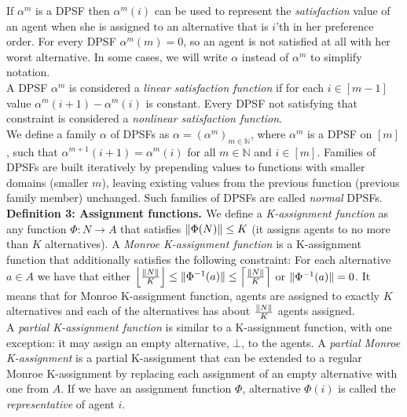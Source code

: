 If $\alpha^{m}$ is a DPSF then $\alpha^{m}(i)$ can be used to represent the \textit{satisfaction} value of an agent when she is assigned to an alternative that is $i$'th in her preference order. For every DPSF $\alpha^{m}(m) = 0$, so an agent is not satisfied at all with her worst alternative. In some cases, we will write $\alpha$ instead of $\alpha^{m}$ to simplify notation.
\\

A DPSF  $\alpha^{m}$ is considered a \textit{linear satisfaction function} if for each $i \in [m-1]$ value $\alpha^{m}(i+1) - \alpha^{m}(i)$ is constant. Every DPSF not satisfying that constraint is considered a \textit{nonlinear satisfaction function}.
\\

We define a family $\alpha$ of DPSFs as $\alpha = (\alpha^{m})_{m \in \mathbb{N}}$, where $\alpha^{m}$ is a DPSF on $[m]$, such that $\alpha^{m+1}(i+1) = \alpha^{m}(i)$ for all $m \in \mathbb{N}$ and $i \in [m]$. Families of DPSFs are built iteratively by prepending values to functions with smaller domains (smaller $m$), leaving existing values from the previous function (previous family member) unchanged. Such families of DPSFs are called \textit{normal} DPSFs.
\\

\noindent
\textbf{Definition 3: Assignment functions. \cite{1}} \hspace{.1in} We define a \textit{K-assignment function} as any function $\Phi: N \rightarrow A$ that satisfies $\lVert\Phi(N)\rVert \leq K$ (it assigns agents to no more than $K$ alternatives). A \textit{Monroe K-assignment function} is a K-assignment function that additionally satisfies the following constraint: For each alternative $a \in A$ we have that either $\left\lfloor \frac{\lVert N\rVert}{K} \right\rfloor \leq \lVert\Phi^{-1}(a)\rVert \leq \left\lceil \frac{\lVert N\rVert}{K} \right\rceil$ or $\lVert\Phi^{-1}(a)\rVert = 0$. It means that for Monroe K-assignment function, agents are assigned to exactly $K$ alternatives and each of the alternatives has about $\frac{\lVert N\rVert}{K}$ agents assigned.
\\

A \textit{partial K-assignment function} is similar to a K-assignment function, with one exception: it may assign an empty alternative, $\bot$, to the agents. A \textit{partial Monroe K-assignment} is a partial K-assignment that can be extended to a regular Monroe K-assignment by replacing each assignment of an empty alternative with one from $A$. If we have an assignment function $\Phi$, alternative $\Phi(i)$ is called the \textit{representative} of agent $i$.
\\

